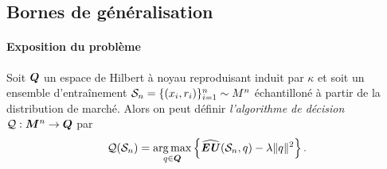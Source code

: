 



\subsection{Bornes de généralisation}
\label{b:gen}


\paragraph{Exposition du problème}

Soit $\Q$ un espace de Hilbert à noyau reproduisant induit par $\kappa$ et soit un ensemble
d'entraînement $\S_n = \{(x_i,r_i)\}_{i=1}^n \sim M^n$ échantilloné à partir de la
distribution de marché. Alors on peut définir \textit{l'algorithme de décision}
$\alg:\M^n \to \Q$ par
\begin{equation}
  \label{b:basic}
  \alg(\S_n) = \argmax_{q \in \Q} \left\{\widehat\EU(\S_n,q) - \lambda\nq{q}^2\right\}.
\end{equation}

